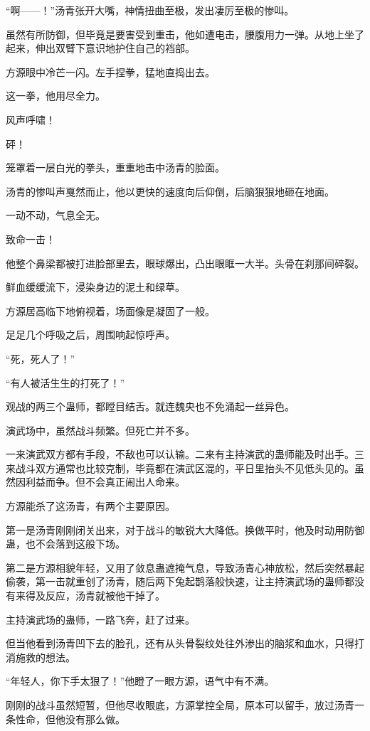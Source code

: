 \begin{this_body}
“啊——！”汤青张开大嘴，神情扭曲至极，发出凄厉至极的惨叫。

虽然有所防御，但毕竟是要害受到重击，他如遭电击，腰腹用力一弹。从地上坐了起来，伸出双臂下意识地护住自己的裆部。

方源眼中冷芒一闪。左手捏拳，猛地直捣出去。

这一拳，他用尽全力。

风声呼啸！

砰！

笼罩着一层白光的拳头，重重地击中汤青的脸面。

汤青的惨叫声戛然而止，他以更快的速度向后仰倒，后脑狠狠地砸在地面。

一动不动，气息全无。

致命一击！

他整个鼻梁都被打进脸部里去，眼球爆出，凸出眼眶一大半。头骨在刹那间碎裂。

鲜血缓缓流下，浸染身边的泥土和绿草。

方源居高临下地俯视着，场面像是凝固了一般。

足足几个呼吸之后，周围响起惊呼声。

“死，死人了！”

“有人被活生生的打死了！”

观战的两三个蛊师，都瞠目结舌。就连魏央也不免涌起一丝异色。

演武场中，虽然战斗频繁。但死亡并不多。

一来演武双方都有手段，不敌也可以认输。二来有主持演武的蛊师能及时出手。三来战斗双方通常也比较克制，毕竟都在演武区混的，平日里抬头不见低头见的。虽然因利益而争。但不会真正闹出人命来。

方源能杀了这汤青，有两个主要原因。

第一是汤青刚刚闭关出来，对于战斗的敏锐大大降低。换做平时，他及时动用防御蛊，也不会落到这般下场。

第二是方源相貌年轻，又用了敛息蛊遮掩气息，导致汤青心神放松，然后突然暴起偷袭，第一击就重创了汤青，随后两下兔起鹊落般快速，让主持演武场的蛊师都没有来得及反应，汤青就被他干掉了。

主持演武场的蛊师，一路飞奔，赶了过来。

但当他看到汤青凹下去的脸孔，还有从头骨裂纹处往外渗出的脑浆和血水，只得打消施救的想法。

“年轻人，你下手太狠了！”他瞪了一眼方源，语气中有不满。

刚刚的战斗虽然短暂，但他尽收眼底，方源掌控全局，原本可以留手，放过汤青一条性命，但他没有那么做。


\end{this_body}
